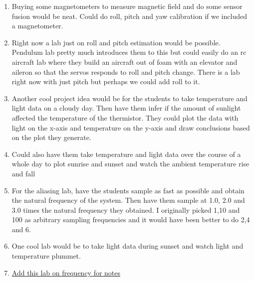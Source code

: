 \begin{enumerate}[itemsep=-5pt]
\item Buying some magnetometers to measure magnetic field and do some sensor fusion would be neat. Could do roll, pitch and yaw calibration if we included a magnetometer.
\item Right now a lab just on roll and pitch estimation would be possible. Pendulum lab pretty much introduces them to this but could easily do an rc aircraft lab where they build an aircraft out of foam with an elevator and aileron so that the servos responds to roll and pitch change. There is a lab right now with just pitch but perhaps we could add roll to it.
\item Another cool project idea would be for the students to take temperature and light data on a cloudy day. Then have them infer if the amount of sunlight affected the temperature of the thermistor. They could plot the data with light on the x-axis and temperature on the y-axis and draw conclusions based on the plot they generate.
\item Could also have them take temperature and light data over the course of a whole day to plot sunrise and sunset and watch the ambient temperature rise and fall
\item For the aliasing lab, have the students sample as fast as possible and obtain the natural frequency of the system. Then have them sample at 1.0, 2.0 and 3.0 times the natural frequency they obtained. I originally picked 1,10 and 100 as arbitrary sampling frequencies and it would have been better to do 2,4 and 6.
\item One cool lab would be to take light data during sunset and watch light and temperature plummet.
\item \href{https://learn.adafruit.com/circuit-playground-o-phonor/musical-note-basics}{Add this lab on frequency for notes}
\end{enumerate}
